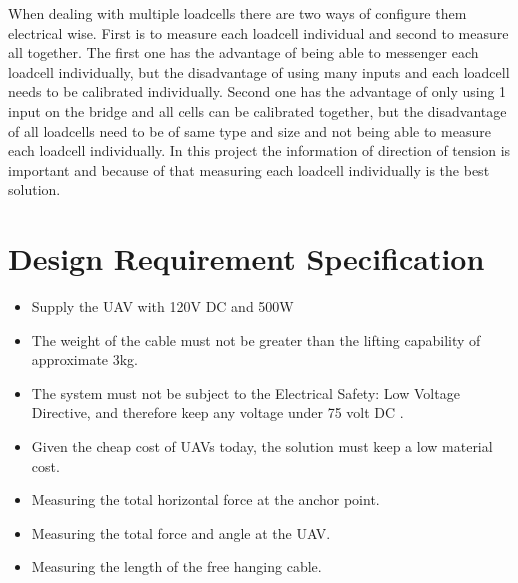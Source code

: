 When dealing with multiple loadcells there are two ways of configure them electrical wise. First is to measure each loadcell individual and second to measure all together. The first one has the advantage of being able to messenger each loadcell individually, but the disadvantage of using many inputs and each loadcell needs to be calibrated individually. Second one has the advantage of only using 1 input on the bridge and all cells can be calibrated together, but the disadvantage of all loadcells need to be of same type and size and not being able to measure each loadcell individually. In this project the information of direction of tension is important and because of that measuring each loadcell individually is the best solution. \cite{PhidgetsInc.2012}


\section{Design Requirement Specification}
\begin{itemize}
\item Supply the UAV with 120V DC and 500W
\item The weight of the cable must not be greater than the lifting capability of approximate 3kg.
\item The system must not be subject to the Electrical Safety: Low Voltage Directive, and therefore keep any voltage under 75 volt DC \cite{Parliament2006}.
\item Given the cheap cost of UAVs today, the solution must keep a low material cost.
\item Measuring the total horizontal force at the anchor point.
\item Measuring the total force and angle at the UAV.
\item Measuring the length of the free hanging cable.
\end{itemize}





